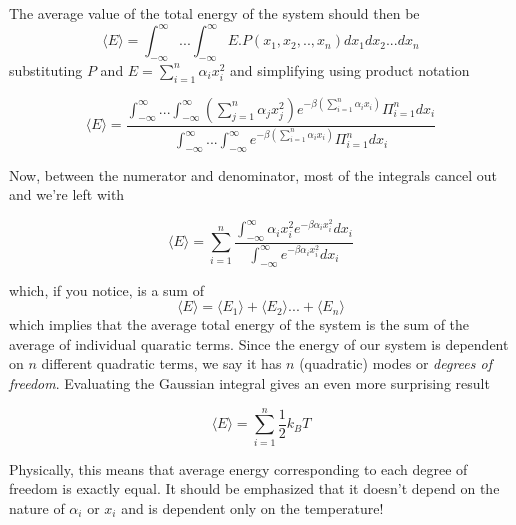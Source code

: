 \documentclass{article}
\newcommand{\f}[2]{\frac{#1}{#2}}
\begin{document}
	The average value of the total energy of the system should then be
	 $$ \langle E \rangle = \int_{-\infty}^{\infty}...\int_{-\infty}^{\infty} E.P(x_1, x_2,..,x_n) dx_1 dx_2... dx_n  $$
	 substituting $P$ and $E = \sum_{i=1}^{n}\alpha_ix_i^2$ and simplifying using product notation
	
	
	$$ \langle E \rangle =  
		\frac{\int_{-\infty}^{\infty} ... {\int_{-\infty}^{\infty}
				 (\sum_{j=1}^{n} \alpha_j x_j^2) e^{-\beta (\sum_{i=1}^{n} \alpha_i x_i)}\Pi_{i=1}^{n}dx_i}}
		{\int_{-\infty}^{\infty} ... {\int_{-\infty}^{\infty} e^{-\beta (\sum_{i=1}^{n} \alpha_i x_i)}} \Pi_{i=1}^{n}dx_i} $$
	
	Now, between the numerator and denominator, most of the integrals cancel out and we're left with
	
	$$ \langle E \rangle = \sum_{i=1}^{n} \frac{
			\int_{-\infty}^{\infty}\alpha_i x_i^2 e^{-\beta \alpha_i x_i^2} dx_i}{\int_{-\infty}^{\infty} e^{-\beta \alpha_i x_i^2} dx_i} 
		$$
		
	which, if you notice, is a sum of \\
	
	$$ \langle E \rangle = \langle E_1 \rangle + \langle E_2 \rangle...  + \langle E_n \rangle $$
	which implies that the average total energy of the system is the sum of the average of individual quaratic terms.
	Since the energy of our system is dependent on $n$ different quadratic terms, we say it has $n$ (quadratic) modes or \textit{degrees of freedom}. Evaluating the Gaussian integral gives an even more surprising result
	
	$$ \langle E \rangle = \sum_{i=1}^{n} \f{1}{2}k_B T $$
	
	Physically, this means that average energy corresponding to each degree of freedom is exactly equal. It should be emphasized that it doesn't depend on the nature of $\alpha_i$ or $x_i$  and is dependent only on the temperature!
\end{document}
